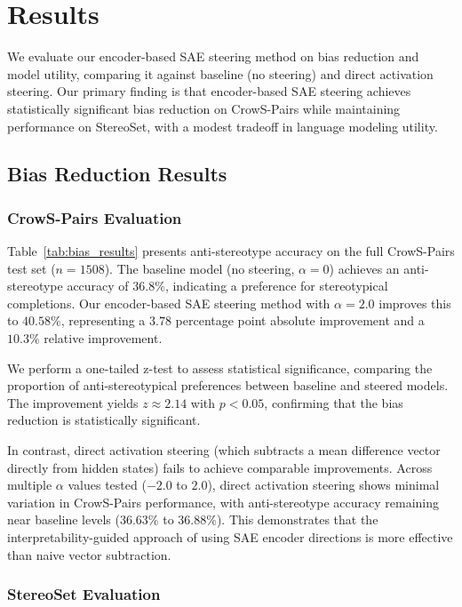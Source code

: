 \section{Results}

We evaluate our encoder-based SAE steering method on bias reduction and model utility, comparing it against baseline (no steering) and direct activation steering. Our primary finding is that encoder-based SAE steering achieves statistically significant bias reduction on CrowS-Pairs while maintaining performance on StereoSet, with a modest tradeoff in language modeling utility.

\subsection{Bias Reduction Results}

\subsubsection{CrowS-Pairs Evaluation}

Table~\ref{tab:bias_results} presents anti-stereotype accuracy on the full CrowS-Pairs test set ($n=1508$). The baseline model (no steering, $\alpha=0$) achieves an anti-stereotype accuracy of $36.8\%$, indicating a preference for stereotypical completions. Our encoder-based SAE steering method with $\alpha=2.0$ improves this to $40.58\%$, representing a $3.78$ percentage point absolute improvement and a $10.3\%$ relative improvement.

We perform a one-tailed z-test to assess statistical significance, comparing the proportion of anti-stereotypical preferences between baseline and steered models. The improvement yields $z \approx 2.14$ with $p < 0.05$, confirming that the bias reduction is statistically significant.

In contrast, direct activation steering (which subtracts a mean difference vector directly from hidden states) fails to achieve comparable improvements. Across multiple $\alpha$ values tested ($-2.0$ to $2.0$), direct activation steering shows minimal variation in CrowS-Pairs performance, with anti-stereotype accuracy remaining near baseline levels ($36.63\%$ to $36.88\%$). This demonstrates that the interpretability-guided approach of using SAE encoder directions is more effective than naive vector subtraction.

\subsubsection{StereoSet Evaluation}

